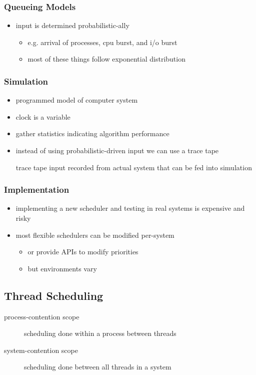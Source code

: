 \documentclass[11pt]{article}
\begin{document}
\subsubsection{Queueing Models}
\label{sec:org69fb3db}
\begin{itemize}
\item input is determined probabilistic-ally
\begin{itemize}
\item e.g. arrival of processes, cpu burst, and i/o burst
\item most of these things follow exponential distribution
\end{itemize}
\end{itemize}
\subsubsection{Simulation}
\label{sec:org53a1893}
\begin{itemize}
\item programmed model of computer system
\item clock is a variable
\item gather statistics indicating algorithm performance
\item instead of using probabilistic-driven input we can use a trace tape
\item[{trace tape}] input recorded from actual system that can be fed into simulation
\end{itemize}
\subsubsection{Implementation}
\label{sec:org38e8fc5}
\begin{itemize}
\item implementing a new scheduler and testing in real systems is expensive and risky
\item most flexible schedulers can be modified per-system
\begin{itemize}
\item or provide APIs to modify priorities
\item but environments vary
\end{itemize}
\end{itemize}
\subsection{Thread Scheduling}
\label{sec:org3685c07}
\begin{description}
\item[{process-contention scope}] scheduling done within a process between threads
\item[{system-contention scope}] scheduling done between all threads in a system
\end{description}
\end{document}
